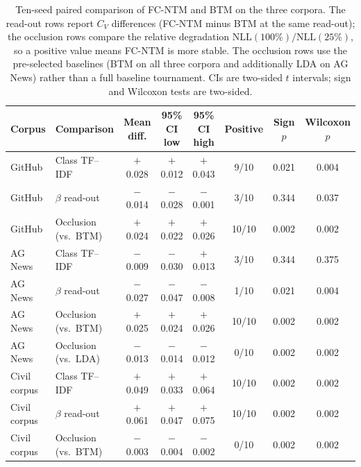 \documentclass[Journal,letterpaper]{ascelike-new}
\newcommand{\fcntm}{FC-NTM}
\begin{document}
\begin{table}[t]
\centering
\caption{Ten-seed paired comparison of \fcntm{} and BTM on the three corpora. The read-out rows report $C_V$ differences (\fcntm{} minus BTM at the same read-out); the occlusion rows compare the relative degradation $\mathrm{NLL}(100\%)/\mathrm{NLL}(25\%)$, so a positive value means \fcntm{} is more stable. The occlusion rows use the pre-selected baselines (BTM on all three corpora and additionally LDA on AG News) rather than a full baseline tournament. CIs are two-sided $t$ intervals; sign and Wilcoxon tests are two-sided.}
\label{tab:seed-paired}
\small
\setlength{\tabcolsep}{4pt}
\begin{tabular}{@{}llcccccc@{}}
\toprule
Corpus & Comparison & Mean diff. & 95\% CI low & 95\% CI high & Positive & Sign $p$ & Wilcoxon $p$ \\
\midrule
GitHub & Class TF--IDF & $+$0.028 & $+$0.012 & $+$0.043 & 9/10 & 0.021 & 0.004 \\
GitHub & $\beta$ read-out & $-$0.014 & $-$0.028 & $-$0.001 & 3/10 & 0.344 & 0.037 \\
GitHub & Occlusion (vs.\ BTM) & $+$0.024 & $+$0.022 & $+$0.026 & 10/10 & 0.002 & 0.002 \\
\midrule
AG News & Class TF--IDF & $-$0.009 & $-$0.030 & $+$0.013 & 3/10 & 0.344 & 0.375 \\
AG News & $\beta$ read-out & $-$0.027 & $-$0.047 & $-$0.008 & 1/10 & 0.021 & 0.004 \\
AG News & Occlusion (vs.\ BTM) & $+$0.025 & $+$0.024 & $+$0.026 & 10/10 & 0.002 & 0.002 \\
AG News & Occlusion (vs.\ LDA) & $-$0.013 & $-$0.014 & $-$0.012 & 0/10 & 0.002 & 0.002 \\
\midrule
Civil corpus & Class TF--IDF & $+$0.049 & $+$0.033 & $+$0.064 & 10/10 & 0.002 & 0.002 \\
Civil corpus & $\beta$ read-out & $+$0.061 & $+$0.047 & $+$0.075 & 10/10 & 0.002 & 0.002 \\
Civil corpus & Occlusion (vs.\ BTM) & $-$0.003 & $-$0.004 & $-$0.002 & 0/10 & 0.002 & 0.002 \\
\bottomrule
\end{tabular}
\end{table}
\end{document}
